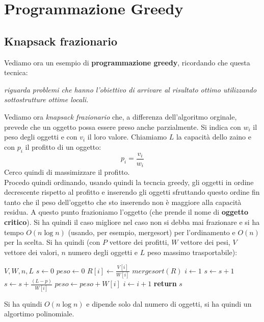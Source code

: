 \documentclass[a4paper,12pt, oneside]{book}
\begin{document}
\chapter{Programmazione Greedy}

\section{Knapsack frazionario}
Vediamo ora un esempio di \textbf{programmazione greedy}, ricordando
che questa tecnica:
\begin{algorithm}
  \textit{riguarda problemi che hanno l’obiettivo di arrivare al
    risultato ottimo utilizzando sottostrutture ottime locali.}
\end{algorithm}
Vediamo ora \textit{knapsack frazionario} che, a differenza
dell'algoritmo orginale, prevede che un oggetto possa essere preso
anche parzialmente. Si indica con $w_i$ il peso degli oggetti e con
$v_i$ il loro valore. Chiamiamo $L$ la capacità dello zaino e con
$p_i$ il profitto di un oggetto:
\[p_i=\frac{v_i}{w_i}\]
Cerco quindi di massimizzare il profitto.\\
Procedo quindi ordinando, usando quindi la tecncia greedy, gli oggetti
in ordine decrescente rispetto al profitto e inserendo gli oggetti
sfruttando questo ordine fin tanto che il peso dell'oggetto che sto
inserendo non è maggiore alla capacità residua. A questo punto
frazioniamo l'oggetto (che prende il nome di \textbf{oggetto
  critico}). Si ha quindi il caso migliore nel caso non si debba mai
frazionare e si ha tempo $O(n\log n)$ (usando, per esempio, mergesort)
per l'ordinamento e $O(n)$ per la scelta.
\newpage
Si ha quindi (con $P$
vettore dei profitti, $W$ vettore dei pesi, $V$ vettore dei valori,
$n$ numero degli oggetti e $L$ peso massimo trasportabile):
\begin{algorithm}[H]
  \begin{algorithmic}
     {$V,W,n,L$}
    \State $s\gets 0$
    \State $peso\gets 0$
    \State
    \State $R[i]\gets \frac{V[i]}{W[i]}$
    \EndFor
    \State $mergesort(R)$
    \State $i\gets 1$
    \State $s\gets s+1$
    \Else
    \State $s\gets s+\frac{(L-p)}{W[i]}$
    \EndIf
    \State $peso\gets peso+W[i]$
    \State $i\gets i+1$
    \EndWhile
    \State \textbf{return} $s$
    \EndFunction
  \end{algorithmic}
\end{algorithm}
Si ha quindi $O(n\log n)$ e dipende solo dal numero di oggetti, si ha
quindi un algortimo polinomiale.
\end{document}
